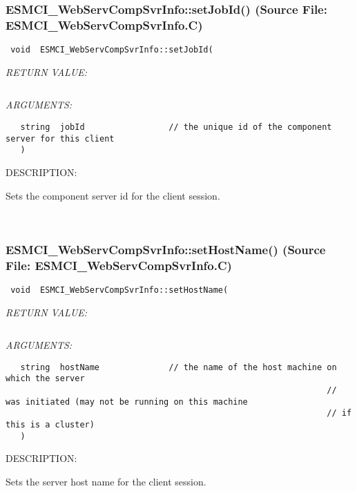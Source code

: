 \subsubsection{ESMCI\_WebServCompSvrInfo::setJobId() (Source File: ESMCI\_WebServCompSvrInfo.C)}


  
\begin{verbatim} void  ESMCI_WebServCompSvrInfo::setJobId(\end{verbatim}{\em RETURN VALUE:}
\begin{verbatim} \end{verbatim}{\em ARGUMENTS:}
\begin{verbatim}   string  jobId                 // the unique id of the component server for this client
   )\end{verbatim}
{\sf DESCRIPTION:\\ }


      Sets the component server id for the client session.
   
 
\mbox{}\hrulefill\
 
\subsubsection{ESMCI\_WebServCompSvrInfo::setHostName() (Source File: ESMCI\_WebServCompSvrInfo.C)}


  
\begin{verbatim} void  ESMCI_WebServCompSvrInfo::setHostName(\end{verbatim}{\em RETURN VALUE:}
\begin{verbatim} \end{verbatim}{\em ARGUMENTS:}
\begin{verbatim}   string  hostName              // the name of the host machine on which the server
                                                                 // was initiated (may not be running on this machine
                                                                 // if this is a cluster)
   )\end{verbatim}
{\sf DESCRIPTION:\\ }


      Sets the server host name for the client session.
   
 

